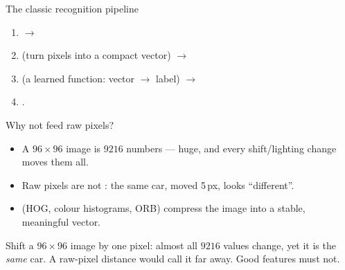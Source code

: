 \documentclass[10pt,aspectratio=169]{beamer}
\begin{document}
\begin{frame}{The classic recognition pipeline}
  \begin{center}
  \end{center}
  \begin{enumerate}
    \item {} $\rightarrow$
    \item {} (turn pixels into a compact vector) $\rightarrow$
    \item {} (a learned function: vector $\rightarrow$ label) $\rightarrow$
    \item {}.
  \end{enumerate}
\end{frame}

\begin{frame}{Why not feed raw pixels?}
  \begin{itemize}
    \item A $96\times96$ image is $9216$ numbers — huge, and every shift/lighting change moves them all.
    \item Raw pixels are not : the same car, moved 5\,px, looks ``different''.
    \item {} (HOG, colour histograms, ORB) compress the image into a stable, meaningful vector.
  \end{itemize}
  \begin{mathbox}
    Shift a $96\times96$ image by one pixel: almost all $9216$ values change, yet it is the \emph{same} car.
    A raw-pixel distance would call it far away. Good features must not.
  \end{mathbox}
\end{frame}
\end{document}
